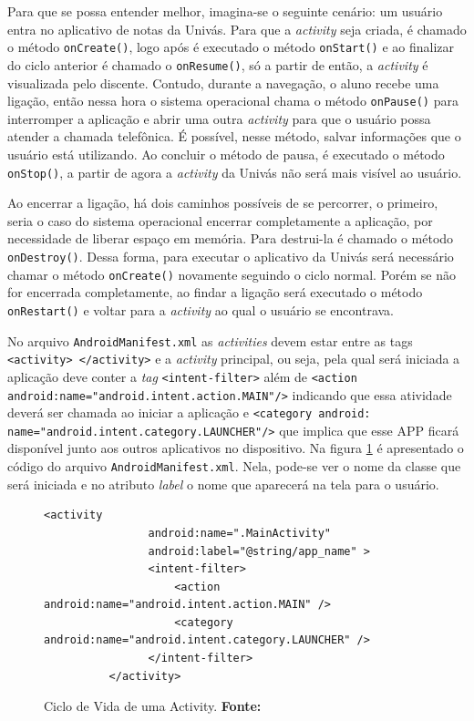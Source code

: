 	\par Para que se possa entender melhor, imagina-se o seguinte cenário: um
usuário entra no aplicativo de notas da Univás. Para que a \textit{activity}
seja criada, é chamado o método \texttt{onCreate()}, logo após é executado o
método \texttt{onStart()} e ao finalizar do ciclo anterior é chamado o
\texttt{onResume()}, só a partir de então, a \textit{activity} é visualizada
pelo discente. Contudo, durante a navegação, o aluno recebe uma ligação, então
nessa hora o sistema operacional chama o método \texttt{onPause()} para
interromper a aplicação e abrir uma outra \textit{activity} para que o usuário
possa atender a chamada telefônica. É possível, nesse método, salvar
informações que o usuário está utilizando. Ao concluir o método de pausa, é
executado o método \texttt{onStop()}, a partir de agora a \textit{activity} da
Univás não será mais visível ao usuário.

 	\par Ao encerrar a ligação, há dois caminhos possíveis de se percorrer, o
primeiro, seria o caso do sistema operacional encerrar completamente a
aplicação, por necessidade de liberar espaço em memória. Para destrui-la é
chamado o método \texttt{onDestroy()}. Dessa forma, para executar o aplicativo
da Univás será necessário chamar o método \texttt{onCreate()} novamente
seguindo o ciclo normal. Porém se não for encerrada completamente, ao findar a
ligação será executado o método \texttt{onRestart()} e voltar para a
\textit{activity} ao qual o usuário se encontrava.

	\par No arquivo \texttt{AndroidManifest.xml} as \textit{activities} devem estar
entre as tags \texttt{<activity> </activity>} e a \textit{activity} principal,
ou seja, pela qual será iniciada a aplicação deve conter a \textit{tag}
\texttt{<intent-filter>} além de \texttt{<action
android:name="android.intent.action.MAIN"/>} indicando que essa atividade
deverá ser chamada ao iniciar a aplicação e \texttt{<category
android:\\name="android.intent.category.LAUNCHER"/>} que implica que esse
APP ficará disponível junto aos outros aplicativos no dispositivo.
Na figura \ref{fig:qt2} é apresentado o código do arquivo
\texttt{AndroidManifest.xml}. Nela, pode-se ver o nome da classe que será
iniciada e no atributo \textit{label} o nome que aparecerá na tela para o
usuário.
	
	\begin{figure}
		\begin{lstlisting}[style=custom_XML]
		  <activity
	            android:name=".MainActivity"
	            android:label="@string/app_name" >
	            <intent-filter>
	                <action android:name="android.intent.action.MAIN" />
	                <category android:name="android.intent.category.LAUNCHER" />
	            </intent-filter>
	      </activity>
		\end{lstlisting}
		\caption[Ciclo de Vida de uma Activity]{Ciclo de Vida de uma
		Activity.
		 \textbf{Fonte:}}
		\label{fig:qt2}
	\end{figure}

